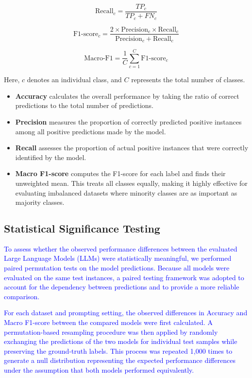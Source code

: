 \documentclass[10pt,letterpaper]{article}
\newcommand{\rev}[1]{\textcolor{blue}{#1}}
\begin{document}
\begin{equation}
\text{Recall}_c = \frac{TP_c}{TP_c + FN_c}
\label{eq:recall}
\end{equation}

\begin{equation}
\text{F1-score}_c = \frac{2 \times \text{Precision}_c \times \text{Recall}_c}{\text{Precision}_c + \text{Recall}_c}
\label{eq:f1score}
\end{equation}

\begin{equation}
\text{Macro-F1} = \frac{1}{C} \sum_{c=1}^{C} \text{F1-score}_c
\label{eq:macro_f1}
\end{equation}

\noindent
Here, \(c\) denotes an individual class, and \(C\) represents the total number of classes. 
\begin{itemize}
    \item \textbf{Accuracy} calculates the overall performance by taking the ratio of correct predictions to the total number of predictions.
    \item \textbf{Precision} measures the proportion of correctly predicted positive instances among all positive predictions made by the model.
    \item \textbf{Recall} assesses the proportion of actual positive instances that were correctly identified by the model.
    \item \textbf{Macro F1-score} computes the F1-score for each label and finds their unweighted mean. This treats all classes equally, making it highly effective for evaluating imbalanced datasets where minority classes are as important as majority classes.
\end{itemize}



\subsection*{Statistical Significance Testing}
\label{sec:statistical_significance}

\rev{To assess whether the observed performance differences between the evaluated Large Language Models (LLMs) were statistically meaningful, we performed paired permutation tests on the model predictions. Because all models were evaluated on the same test instances, a paired testing framework was adopted to account for the dependency between predictions and to provide a more reliable comparison.}

\rev{For each dataset and prompting setting, the observed differences in Accuracy and Macro F1-score between the compared models were first calculated. A permutation-based resampling procedure was then applied by randomly exchanging the predictions of the two models for individual test samples while preserving the ground-truth labels. This process was repeated 1,000 times to generate a null distribution representing the expected performance differences under the assumption that both models performed equivalently.}
\end{document}
